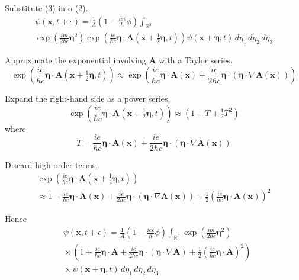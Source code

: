 \documentclass[12pt]{article}
\newcommand\INT{\int_{\mathbb R^3}}
\begin{document}
Substitute (3) into (2).
\begin{multline*}
\psi(\mathbf x,t+\epsilon)=
\frac{1}{A}\left(1-\frac{ie\epsilon}{\hbar}\phi\right)\INT
\\
\exp\left(\frac{im}{2\hbar\epsilon}\boldsymbol\eta^2\right)
\exp\left(\frac{ie}{\hbar c}\boldsymbol\eta\cdot\mathbf A\left(\mathbf x+\tfrac{1}{2}\boldsymbol\eta,t\right)\right)
\psi(\mathbf x+\boldsymbol\eta,t)
\,d\eta_1\,d\eta_2\,d\eta_3
\end{multline*}

Approximate the exponential involving $\mathbf A$ with a Taylor series.
\begin{equation*}
\exp\left(\frac{ie}{\hbar c}\boldsymbol\eta\cdot\mathbf A\left(\mathbf x+\tfrac{1}{2}\boldsymbol\eta,t\right)\right)
\approx
\exp\left(
\frac{ie}{\hbar c}\boldsymbol\eta\cdot\mathbf A(\mathbf x)
+\frac{ie}{2\hbar c}\boldsymbol\eta\cdot(\boldsymbol\eta\cdot\nabla\mathbf A(\mathbf x))
\right)
\end{equation*}

Expand the right-hand side as a power series.
\begin{equation*}
\exp\left(\frac{ie}{\hbar c}\boldsymbol\eta\cdot\mathbf A\left(\mathbf x+\tfrac{1}{2}\boldsymbol\eta,t\right)\right)
\approx
\left(1+T+\tfrac{1}{2}T^2\right)
\end{equation*}
where
\begin{equation*}
T=\frac{ie}{\hbar c}\boldsymbol\eta\cdot\mathbf A(\mathbf x)
+\frac{ie}{2\hbar c}\boldsymbol\eta\cdot(\boldsymbol\eta\cdot\nabla\mathbf A(\mathbf x))
\end{equation*}

Discard high order terms.
\begin{multline*}
\exp\left(\frac{ie}{\hbar c}\boldsymbol\eta\cdot\mathbf A\left(\mathbf x+\tfrac{1}{2}\boldsymbol\eta,t\right)\right)
\\
\approx
1+\frac{ie}{\hbar c}\boldsymbol\eta\cdot\mathbf A(\mathbf x)
+\frac{ie}{2\hbar c}\boldsymbol\eta\cdot(\boldsymbol\eta\cdot\nabla\mathbf A(\mathbf x))
+\frac{1}{2}\left(\frac{ie}{\hbar c}\boldsymbol\eta\cdot\mathbf A(\mathbf x)\right)^2
\end{multline*}

Hence
\begin{align*}
&\psi(\mathbf x,t+\epsilon)=
\frac{1}{A}
\left(1-\frac{ie\epsilon}{\hbar}\phi\right)
\INT\exp\left(\frac{im}{2\hbar\epsilon}\boldsymbol\eta^2\right)
\\
&{}\times\left(
1
+\frac{ie}{\hbar c}\boldsymbol\eta\cdot\mathbf A
+\frac{ie}{2\hbar c}\boldsymbol\eta\cdot(\boldsymbol\eta\cdot\nabla\mathbf A)
+\frac{1}{2}\left(\frac{ie}{\hbar c}\boldsymbol\eta\cdot\mathbf A\right)^2
\right)
\\
&{}\times\psi(\mathbf x+\boldsymbol\eta,t)
\,d\eta_1\,d\eta_2\,d\eta_3
\tag{4}
\end{align*}
\end{document}
